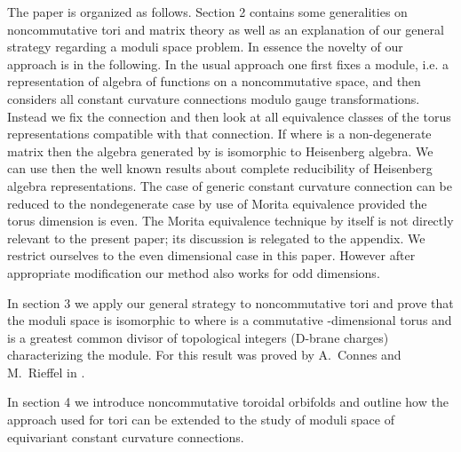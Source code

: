 \documentclass[a4paper,a4paper]{article}
\begin{document}
The paper is organized as follows. Section 2 contains some generalities on noncommutative tori 
and matrix theory as well as an explanation of our general strategy regarding a moduli space problem. 
In essence the novelty of our approach is in the following. In the usual approach one  first fixes a module, i.e. a 
representation of algebra of functions on a noncommutative space,  
and then considers all constant curvature connections modulo gauge transformations. Instead we fix the connection \coordHE{} and 
then look at all equivalence classes of the torus representations compatible with that connection. 
If \coordHE{} where \coordHE{} is a non-degenerate matrix then the  algebra generated by 
\coordHE{} is isomorphic to Heisenberg algebra. We can use then the well known results about complete reducibility 
of Heisenberg algebra representations. The case of generic constant curvature connection can be reduced to the nondegenerate 
case by use of Morita equivalence provided the torus dimension is even. The  Morita equivalence technique by itself is not directly 
relevant to the present paper; its discussion is relegated to the appendix. 
We restrict ourselves to the even dimensional 
case in this paper. However after appropriate modification our method also works for odd dimensions.
 


In section 3 we apply our general strategy to noncommutative tori and prove that the moduli space 
is isomorphic to \coordHE{} where \coordHE{} is a commutative \coordHE{}-dimensional torus and 
\coordHE{} is a greatest common divisor of topological integers 
(D-brane charges) characterizing the module. For \coordHE{} this result was proved by A.~Connes and M.~Rieffel in \cite{ConnesRieffel}.


In section 4 we introduce noncommutative toroidal orbifolds and  outline how the approach used for 
tori can be extended to the study of moduli space of equivariant constant curvature connections.
\end{document}
